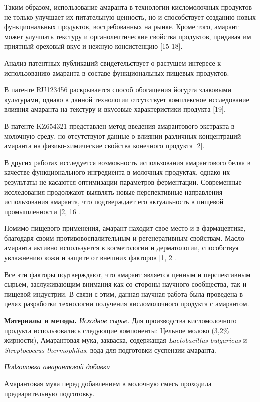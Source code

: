 \begin{multicols}{2}
Таким образом, использование амаранта в технологии кисломолочных
продуктов не только улучшает их питательную ценность, но и способствует
созданию новых функциональных продуктов, востребованных на рынке. Кроме
того, амарант может улучшать текстуру и органолептические свойства
продуктов, придавая им приятный ореховый вкус и нежную консистенцию
{[}15-18{]}.

Анализ патентных публикаций свидетельствует о растущем интересе к
использованию амаранта в составе функциональных пищевых продуктов.

В патенте RU123456 раскрывается способ обогащения йогурта злаковыми
культурами, однако в данной технологии отсутствует комплексное
исследование влияния амаранта на текстуру и вкусовые характеристики
продукта {[}19{]}.

В патенте KZ654321 представлен метод введения амарантового экстракта в
молочную среду, но отсутствуют данные о влиянии различных концентраций
амаранта на физико-химические свойства конечного продукта {[}2{]}.

В других работах исследуется возможность использования амарантового
белка в качестве функционального ингредиента в молочных продуктах,
однако их результаты не касаются оптимизации параметров ферментации.
Современные исследования продолжают выявлять новые перспективные
направления использования амаранта, что подтверждает его актуальность в
пищевой промышленности {[}2, 16{]}.

Помимо пищевого применения, амарант находит свое место и в фармацевтике,
благодаря своим противовоспалительным и регенеративным свойствам. Масло
амаранта активно используется в косметологии и дерматологии, способствуя
увлажнению кожи и защите от внешних факторов {[}1, 2{]}.

Все эти факторы подтверждают, что амарант является ценным и
перспективным сырьем, заслуживающим внимания как со стороны научного
сообщества, так и пищевой индустрии. В связи с этим, данная научная
работа была проведена в целях разработки технологии получения
кисломолочного продукта с амарантом.

{\bfseries Материалы и методы.} \emph{Исходное сырье.} Для производства
кисломолочного продукта использовались следующие компоненты: Цельное
молоко (3,2\% жирности), Амарантовая мука, закваска, содержащая
\emph{Lactobacillus bulgaricus} и \emph{Streptococcus thermophilus},
вода для подготовки суспензии амаранта.

\emph{Подготовка амарантовой добавки}

Амарантовая мука перед добавлением в молочную смесь проходила
предварительную подготовку.


\end{multicols}
